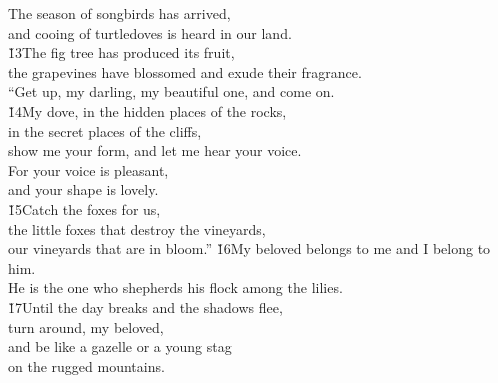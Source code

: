 \begin{poetry}
\poemll    The season of songbirds has arrived, \\
\poemlll       and cooing of turtledoves is heard in our land. \\
\poeml \v{13}The fig tree has produced its fruit, \\
\poemll    the grapevines have blossomed and exude their fragrance. \\
\poeml ``Get up, my darling, my beautiful one, and come on. \\
\poeml \v{14}My dove, in the hidden places of the rocks, \\
\poemll    in the secret places of the cliffs, \\
\poeml show me your form, and let me hear your voice. \\
\poemll    For your voice is pleasant, \\
\poemlll       and your shape is lovely. \\
\poeml \v{15}Catch the foxes for us, \\
\poemll    the little foxes that destroy the vineyards, \\
\poemlll       our vineyards that are in bloom.''
\poeml \v{16}My beloved belongs to me and I belong to him. \\
\poemll    He is the one who shepherds his flock among the lilies. \\
\poeml \v{17}Until the day breaks and the shadows flee, \\
\poemll    turn around, my beloved, \\
\poeml and be like a gazelle or a young stag \\
\poemll    on the rugged mountains.
\end{poetry}

